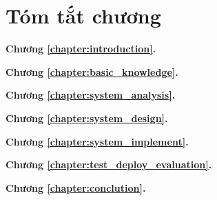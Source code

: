 \chapter*{Tóm tắt chương}
\quad\;\;\;\textbf{Chương \ref{chapter:introduction}. }


 
\textbf{Chương \ref{chapter:basic_knowledge}. }



\textbf{Chương \ref{chapter:system_analysis}. }



\textbf{Chương \ref{chapter:system_design}. }



\textbf{Chương \ref{chapter:system_implement}. }



\textbf{Chương \ref{chapter:test_deploy_evaluation}. }



\textbf{Chương \ref{chapter:conclution}. }

